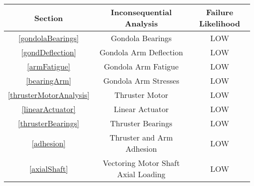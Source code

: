 \documentclass[../main.tex]{subfiles}
\begin{document}
\begin{center}
	 \label{inconsequentialAnalysis}
	\begin{tabular}{|c|c|c|}
	\hline
	\textbf{Section} &\textbf{Inconsequential Analysis} & \textbf{Failure Likelihood} \\
	\hline
	\ref{gondolaBearings} & Gondola Bearings & LOW \\
	\hline
	\ref{gondDeflection} & Gondola Arm Deflection  & LOW \\
	\hline
	\ref{armFatigue} & Gondola Arm Fatigue & LOW \\
	\hline
	\ref{bearingArm} & Gondola Arm Stresses & LOW \\
	\hline
	\ref{thrusterMotorAnalysis} & Thruster Motor & LOW \\
	\hline
	\ref{linearActuator} & Linear Actuator & LOW \\
	\hline
	\ref{thrusterBearings} & Thruster Bearings & LOW \\
	\hline
	\ref{adhesion} & Thruster and Arm Adhesion & LOW \\
	\hline
	\ref{axialShaft} & Vectoring Motor Shaft Axial Loading & LOW \\
	\hline
	\end{tabular}
\end{center}
\end{document}
